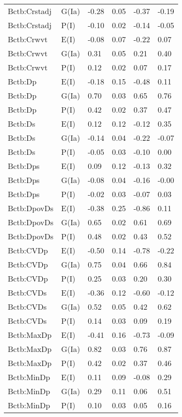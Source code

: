 \begin{center}
\begin{longtable}{|p{1.1in}|p{0.7in}|p{0.7in}|p{0.6in}|p{0.6in}|p{0.6in}|}
  Bctb:Crstadj & G(Ia) & -0.28 & 0.05 & -0.37 & -0.19 \\ 
  Bctb:Crstadj & P(I) & -0.10 & 0.02 & -0.14 & -0.05 \\ 
  Bctb:Crwvt & E(I) & -0.08 & 0.07 & -0.22 & 0.07 \\ 
  Bctb:Crwvt & G(Ia) & 0.31 & 0.05 & 0.21 & 0.40 \\ 
  Bctb:Crwvt & P(I) & 0.12 & 0.02 & 0.07 & 0.17 \\ 
  Bctb:Dp & E(I) & -0.18 & 0.15 & -0.48 & 0.11 \\ 
  Bctb:Dp & G(Ia) & 0.70 & 0.03 & 0.65 & 0.76 \\ 
  Bctb:Dp & P(I) & 0.42 & 0.02 & 0.37 & 0.47 \\ 
  Bctb:Ds & E(I) & 0.12 & 0.12 & -0.12 & 0.35 \\ 
  Bctb:Ds & G(Ia) & -0.14 & 0.04 & -0.22 & -0.07 \\ 
  Bctb:Ds & P(I) & -0.05 & 0.03 & -0.10 & 0.00 \\ 
  Bctb:Dps & E(I) & 0.09 & 0.12 & -0.13 & 0.32 \\ 
  Bctb:Dps & G(Ia) & -0.08 & 0.04 & -0.16 & -0.00 \\ 
  Bctb:Dps & P(I) & -0.02 & 0.03 & -0.07 & 0.03 \\ 
  Bctb:DpovDs & E(I) & -0.38 & 0.25 & -0.86 & 0.11 \\ 
  Bctb:DpovDs & G(Ia) & 0.65 & 0.02 & 0.61 & 0.69 \\ 
  Bctb:DpovDs & P(I) & 0.48 & 0.02 & 0.43 & 0.52 \\ 
  Bctb:CVDp & E(I) & -0.50 & 0.14 & -0.78 & -0.22 \\ 
  Bctb:CVDp & G(Ia) & 0.75 & 0.04 & 0.66 & 0.84 \\ 
  Bctb:CVDp & P(I) & 0.25 & 0.03 & 0.20 & 0.30 \\ 
  Bctb:CVDs & E(I) & -0.36 & 0.12 & -0.60 & -0.12 \\ 
  Bctb:CVDs & G(Ia) & 0.52 & 0.05 & 0.42 & 0.62 \\ 
  Bctb:CVDs & P(I) & 0.14 & 0.03 & 0.09 & 0.19 \\ 
  Bctb:MaxDp & E(I) & -0.41 & 0.16 & -0.73 & -0.09 \\ 
  Bctb:MaxDp & G(Ia) & 0.82 & 0.03 & 0.76 & 0.87 \\ 
  Bctb:MaxDp & P(I) & 0.42 & 0.02 & 0.37 & 0.46 \\ 
  Bctb:MinDp & E(I) & 0.11 & 0.09 & -0.08 & 0.29 \\ 
  Bctb:MinDp & G(Ia) & 0.29 & 0.11 & 0.06 & 0.51 \\ 
  Bctb:MinDp & P(I) & 0.10 & 0.03 & 0.05 & 0.16 \\ 

\end{longtable}
\end{center}
